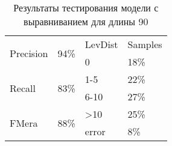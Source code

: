 \begin{table}[h]
\centering
\begin{tabular}{|p{2cm}|p{2cm}||p{2cm}|p{2cm}|}
\hline
\multirow{2}{*}{Precision} & \multirow{2}{*}{94\%} & LevDist & Samples \\ \cline{3-4} 
 &  & 0 & 18\% \\ \hline
\multirow{2}{*}{Recall} & \multirow{2}{*}{83\%} & 1-5 & 22\% \\ \cline{3-4} 
 &  & 6-10 & 27\% \\ \hline
\multirow{2}{*}{FMera} & \multirow{2}{*}{88\%} & \textgreater{}10 & 25\% \\ \cline{3-4} 
 &  & error & 8\% \\ \hline
\end{tabular}
\caption{Результаты тестирования модели с выравниванием для длины 90}
\label{table2}
\end{table}